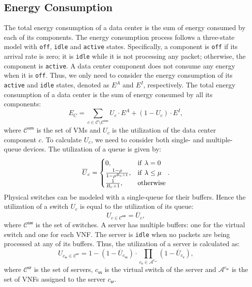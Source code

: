 \subsection{Energy Consumption}
\label{sec:energy}

The total energy consumption of a data center is the sum of energy consumed by each of its components. The energy consumption process follows a three-state model with \texttt{off}, \texttt{idle} and \texttt{active} states. Specifically, a component is \texttt{off} if its arrival rate is zero; it is \texttt{idle} while it is not processing any packet; otherwise, the component is \texttt{active}. A data center component does not consume any energy when it is \texttt{off}. Thus, we only need to consider the energy consumption of its \texttt{active} and \texttt{idle} states, denoted as $E^A$ and $E^I$, respectively. The total energy consumption of a data center is the sum of energy consumed by all its components:
\begin{equation}
    E_C=\sum_{c\in\mathcal{C}\setminus\mathcal{C}^{\mathsf{vm}}} U_c\cdot E^A+(1-U_c)\cdot E^I,
	\label{eq:sum_energy}
\end{equation}
where $\mathcal{C}^{\mathsf{vm}}$ is the set of VMs and $U_c$ is the utilization of the data center component $c$. To calculate $U_c$, we need to consider both single- and multiple-queue devices. The utilization of a queue is given by:
\begin{equation}
	\overline{U}_c =
	\begin{cases}
		0, & \rm{if} \ \lambda=0 \\
		\frac{1-\rho}{1-\rho^{B_c+1}}, & \rm{if}\ \lambda\le\mu \\ 
		\frac{1}{B_c+1}, & { \rm{otherwise} }
	\end{cases}.
	\label{eq:u}
\end{equation}
Physical switches can be modeled with a single-queue for their buffers. Hence the utilization of a switch $U_c$ is equal to the utilization of its queue:
\begin{equation}
    U_{c \in\mathcal{C}^{\mathsf{sw}}} = \overline{U}_c,
\end{equation}
where $\mathcal{C}^{\mathsf{sw}}$ is the set of switches. A server has multiple buffers: one for the virtual switch and one for each VNF. The server is \texttt{idle} when no packets are being processed at any of its buffers. Thus, the utilization of a server is calculated as:
\begin{equation}
	U_{c_{\mathsf{sr}}\in\mathcal{C}^\mathsf{sr}}=1-\left(1-\overline{U}_{c_{\mathsf{vs}}} \right)\cdot\prod_{c_{\mathsf{v}}\in\mathcal{A}^{c_{sr}}}\left(1-\overline{U}_{c_{\mathsf{v}}} \right),
	\label{eq:us}
\end{equation}
where $\mathcal{C}^\mathsf{sr}$ is the set of servers, $c_{\mathsf{vs}}$ is the virtual switch of the server and $\mathcal{A}^{c_\mathsf{sr}}$ is the set of VNFs assigned to the server $c_\mathsf{sr}$.
